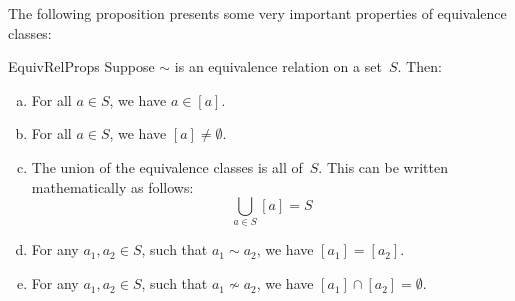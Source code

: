 The following proposition presents some very important properties of equivalence classes:

\begin{prop}{EquivRelProps}
Suppose $\sim$ is an equivalence relation on a set~$S$. Then:
\begin{enumerate}[(a)]
\item \label{EquivRelProps-aIn[a]}
 For all $a \in S$, we have $a \in [a]$.
\item \label{EquivRelProps-nonempty}
 For all $a \in S$, we have $[a] \neq \emptyset$.
\item \label{EquivRelProps-union}
 The union of the equivalence classes is all of~$S$. This can be written mathematically as follows:
	$$ \bigcup_{a \in S} [a] = S$$
\item \label{EquivRelProps-equal}
 For any $a_1,a_2 \in S$, such that $a_1 \sim a_2$, we have $[a_1] = [a_2]$.
\item \label{EquivRelProps-disjoint}
 For any $a_1,a_2 \in S$, such that $a_1 \not\sim a_2$, we have $[a_1] \cap [a_2] = \emptyset$.
\end{enumerate}
\end{prop}

